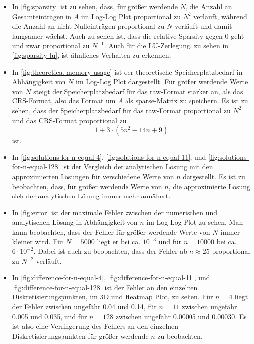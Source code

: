 \documentclass{scrartcl}
\begin{document}
\begin{itemize}
    \item In \autoref{fig:sparsity} ist zu sehen, dass, für größer werdende
          \(N\), die Anzahl an Gesamteinträgen in \(A\) im Log-Log Plot
          proportional zu \(N^2\) verläuft, während die Anzahl an
          nicht-Nulleinträgen proportional zu \(N\) verläuft und damit
          langsamer wächst. Auch zu sehen ist, dass die relative Sparsity gegen
          0 geht und zwar proportional zu \(N^{-1}\). Auch für die
          LU-Zerlegung, zu sehen in \autoref{fig:sparsity-lu}, ist ähnliches
          Verhalten zu erkennen.

    \item In \autoref{fig:theoretical-memory-usage} ist der theoretische
          Speicherplatzbedarf in Abhängigkeit von \(N\) im Log-Log Plot
          dargestellt. Für größer werdende Werte von \(N\) steigt der
          Speicherplatzbedarf für das raw-Format stärker an, als das
          CRS-Format, also das Format um \(A\) als sparse-Matrix zu speichern.
          Es ist zu sehen, dass der Speicherplatzbedarf für das raw-Format
          proportional zu \(N^2\) und das CRS-Format proportional zu
          \[
              1 + 3 \cdot (5n^2 - 14n + 9)
          \]
          ist.

    \item In \autoref{fig:solutions-for-n-equal-4},
          \autoref{fig:solutions-for-n-equal-11}, und
          \autoref{fig:solutions-for-n-equal-128} ist der Vergleich der
          analytischen Lösung mit den approximierten Lösungen für verschiedene
          Werte von \(n\) dargestellt. Es ist zu beobachten, dass, für größer
          werdende Werte von \(n\), die approximierte Lösung sich der
          analytischen Lösung immer mehr annähert.

    \item In \autoref{fig:error} ist der maximale Fehler zwischen der
          numerischen und analytischen Lösung in Abhängigkeit von \(n\) im
          Log-Log Plot zu sehen. Man kann beobachten, dass der Fehler für
          größer werdende Werte von \(N\) immer kleiner wird. Für \(N = 5000\)
          liegt er bei ca. \(10^{-3}\) und für \(n = 10000\) bei ca. \(6 \cdot
          10^{-2}\). Dabei ist auch zu beobachten, dass der Fehler ab \(n
          \approx 25\) proportional zu \(N^{-2}\) verläuft.

    \item In \autoref{fig:difference-for-n-equal-4},
          \autoref{fig:difference-for-n-equal-11}, und
          \autoref{fig:difference-for-n-equal-128} ist der Fehler an den
          einzelnen Diskretisierungspunkten, im 3D und Heatmap Plot, zu sehen.
          Für \(n = 4\) liegt der Fehler zwischen ungefähr 0.04 und 0.14, für
          \(n = 11\) zwischen ungefähr 0.005 und 0.035, und für \(n = 128\)
          zwischen ungefähr 0.00005 und 0.00030. Es ist also eine Verringerung
          des Fehlers an den einzelnen Diskretisierungspunkten für größer
          werdende \(n\) zu beobachten.
\end{itemize}
\end{document}
